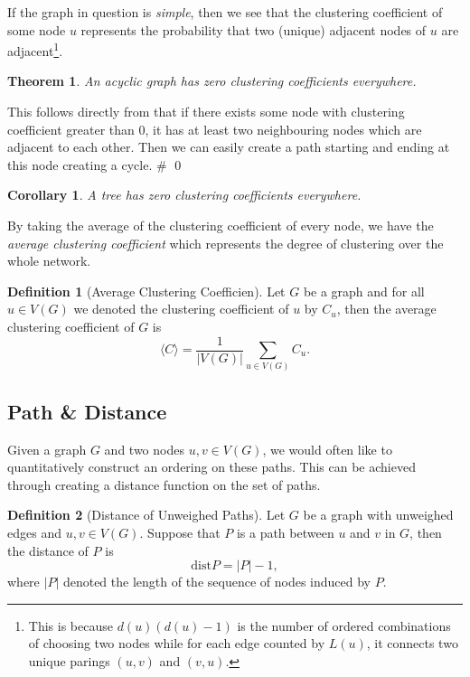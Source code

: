 \documentclass[
]{article}
\newtheorem{theorem}{Theorem}
\newtheorem{corollary}{Corollary}[theorem]
\theoremstyle{definition}
\newtheorem{definition}{Definition}[section]
\begin{document}
If the graph in question is \emph{simple}, then we see that the
clustering coefficient of some node \(u\) represents the probability
that two (unique) adjacent nodes of \(u\) are
adjacent\footnote{This is because \(d(u)(d(u) - 1)\) 
is the number of ordered combinations of choosing two nodes while for each 
edge counted by \(L(u)\), it connects two unique parings \((u, v)\) and 
\((v, u)\).}.

\begin{theorem}
  An acyclic graph has zero clustering coefficients everywhere.
\end{theorem}
\proof

This follows directly from that if there exists some node with
clustering coefficient greater than 0, it has at least two neighbouring
nodes which are adjacent to each other. Then we can easily create a path
starting and ending at this node creating a cycle. \# \qed

\begin{corollary}
  A tree has zero clustering coefficients everywhere.
\end{corollary}

By taking the average of the clustering coefficient of every node, we
have the \emph{average clustering coefficient} which represents the
degree of clustering over the whole network.

\begin{definition}[Average Clustering Coefficien]
  Let \(G\) be a graph and for all \(u \in V(G)\) we denoted the clustering 
  coefficient of \(u\) by \(C_u\), then the average clustering coefficient of 
  \(G\) is
  \[\langle C \rangle = \frac{1}{\left| V(G) \right|} \sum_{u \in V(G)} C_u.\]
\end{definition}

\hypertarget{path-distance}{%
\subsection{Path \& Distance}\label{path-distance}}

Given a graph \(G\) and two nodes \(u, v \in V(G)\), we would often like
to quantitatively construct an ordering on these paths. This can be
achieved through creating a distance function on the set of paths.

\begin{definition}[Distance of Unweighed Paths]
  Let \(G\) be a graph with unweighed edges and \(u, v \in V(G)\). Suppose that 
  \(P\) is a path between \(u\) and \(v\) in \(G\), then the distance of \(P\) is
  \[\text{dist} P = \left| P \right| - 1, \] 
  where \(\left| P \right|\) denoted the length of the sequence of nodes induced 
  by \(P\).
\end{definition}
\end{document}
